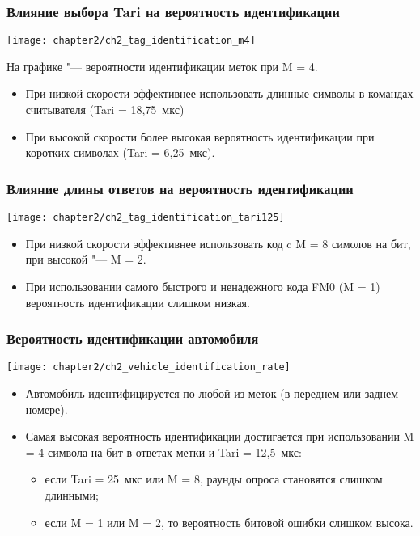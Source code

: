 \begin{frame}
    \frametitle{Влияние выбора Tari на вероятность идентификации}
    \begin{center}
        \texttt{[image: chapter2/ch2\_tag\_identification\_m4]}
    \end{center}
    На графике "--- вероятности идентификации меток при M = 4.
    \begin{itemize}
    \item При низкой скорости эффективнее использовать длинные символы в командах считывателя (Tari = 18,75~мкс)
    \item При высокой скорости более высокая вероятность идентификации при коротких символах (Tari = 6,25~мкс).
    \end{itemize}
\end{frame}

\begin{frame}
    \frametitle{Влияние длины ответов на вероятность идентификации}
    \begin{center}
        \texttt{[image: chapter2/ch2\_tag\_identification\_tari125]}
    \end{center}
    \begin{itemize}
        \item При низкой скорости эффективнее использовать код c M = 8 симолов на бит, при высокой "--- M = 2.
        \item При использовании самого быстрого и ненадежного кода FM0 (M = 1) вероятность идентификации слишком низкая.
    \end{itemize}
\end{frame}

\begin{frame}
    \frametitle{Вероятность идентификации автомобиля}
    \begin{center}
        \texttt{[image: chapter2/ch2\_vehicle\_identification\_rate]}
    \end{center}
    \begin{itemize}
        \item Автомобиль идентифицируется по любой из меток (в переднем или заднем номере).
        \item Самая высокая вероятность идентификации достигается при использовании M = 4 символа на бит в ответах метки и Tari = 12,5~мкс:
        \begin{itemize}
            \item если Tari = 25~мкс или M = 8, раунды опроса становятся слишком длинными;
            \item если M = 1 или M = 2, то вероятность битовой ошибки слишком высока.
        \end{itemize}
    \end{itemize}

\end{frame}



